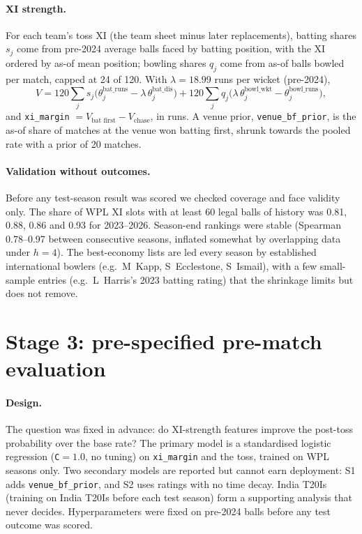\documentclass[11pt]{article}
\newcommand{\code}[1]{\texttt{#1}}
\begin{document}
\paragraph{XI strength.} For each team's toss XI (the team sheet minus later replacements), batting shares
$s_j$ come from pre-2024 average balls faced by batting position, with the XI ordered by as-of mean
position; bowling shares $q_j$ come from as-of balls bowled per match, capped at 24 of 120. With
$\lambda=18.99$ runs per wicket (pre-2024),
\begin{equation}
  V = 120\sum_j s_j\bigl(\theta^{\text{bat\_runs}}_j-\lambda\,\theta^{\text{bat\_dis}}_j\bigr)
    + 120\sum_j q_j\bigl(\lambda\,\theta^{\text{bowl\_wkt}}_j-\theta^{\text{bowl\_runs}}_j\bigr),
\end{equation}
and \code{xi\_margin} $=V_{\text{bat first}}-V_{\text{chase}}$, in runs. A venue prior,
\code{venue\_bf\_prior}, is the as-of share of matches at the venue won batting first, shrunk towards the
pooled rate with a prior of 20 matches.

\paragraph{Validation without outcomes.} Before any test-season result was scored we checked coverage and
face validity only. The share of WPL XI slots with at least 60 legal balls of history was 0.81, 0.88, 0.86
and 0.93 for 2023--2026. Season-end rankings were stable (Spearman 0.78--0.97 between consecutive seasons,
inflated somewhat by overlapping data under $h=4$). The best-economy lists are led every season by
established international bowlers (e.g.\ M~Kapp, S~Ecclestone, S~Ismail), with a few small-sample entries
(e.g.\ L~Harris's 2023 batting rating) that the shrinkage limits but does not remove.

\section{Stage 3: pre-specified pre-match evaluation}\label{sec:prematch}

\paragraph{Design.} The question was fixed in advance: do XI-strength features improve the post-toss
probability over the base rate? The primary model is a standardised logistic regression
(\code{C}$=1.0$, no tuning) on \code{xi\_margin} and the toss, trained on WPL seasons only. Two secondary
models are reported but cannot earn deployment: S1 adds \code{venue\_bf\_prior}, and S2 uses ratings with
no time decay. India T20Is (training on India T20Is before each test season) form a supporting analysis
that never decides. Hyperparameters were fixed on pre-2024 balls before any test outcome was scored.
\end{document}
